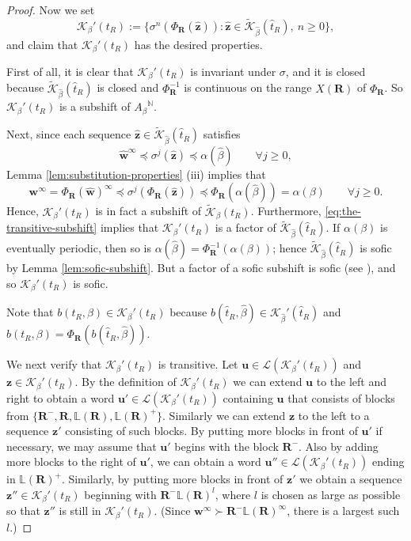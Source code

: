 \documentclass[11pt]{amsart}
\theoremstyle{definition}
\theoremstyle{remark}
\numberwithin{equation}{section}
\newcommand{\N}{\ensuremath{\mathbb{N}}}
\renewcommand{\L}{\ensuremath{\mathbb{L}}}
\newcommand{\Kt}{\widetilde{\mathcal{K}}}
\newcommand{\bR}{\mathbf{R}}
\newcommand{\cL}{\mathcal{L}}
\renewcommand{\u}{\mathbf{u}}
\newcommand{\w}{\mathbf{w}}
\newcommand{\z}{\mathbf{z}}
\newcommand{\f}{\infty}
\newcommand{\al}{\alpha}
\newcommand{\lle}{\preccurlyeq}
\begin{document}
\begin{proof}
Now we set
\begin{equation} \label{eq:the-transitive-subshift}
\mathcal{K}_\beta'(t_R):=\{\sigma^n(\Phi_{\bR}(\hat{\z})): \hat{\z}\in \Kt_{\hat\beta}(\hat{t}_R),\ n\geq 0\},
\end{equation}
and claim that $\mathcal{K}_\beta'(t_R)$ has the desired properties.

First of all, it is clear that $\mathcal{K}_\beta'(t_R)$ is invariant under $\sigma$, and it is closed because {$\Kt_{\hat\beta}(\hat{t}_R)$} is closed and $\Phi_{\bR}^{-1}$ is continuous on the range $X(\bR)$ of $\Phi_{\bR}$. So $\mathcal{K}_\beta'(t_R)$ is a subshift of ${A_\beta}^\N$.

Next, since each sequence $\hat{\z}\in \Kt_{\hat\beta}(\hat{t}_R)$ satisfies
\[
\hat{\w}^\f\lle\sigma^j(\hat{\z})\lle \alpha(\hat{\beta}) \qquad \forall j\geq 0,
\]
Lemma \ref{lem:substitution-properties} (iii) implies that
\[
\w^\f=\Phi_{\bR}(\hat{\w})^\f\lle \sigma^j(\Phi_{\bR}(\hat{\z}))\lle \Phi_{\bR}(\alpha(\hat{\beta}))=\alpha(\beta) \qquad \forall j\geq 0.
\]
Hence, $\mathcal{K}_\beta'(t_R)$ is in fact a subshift of $\Kt_\beta(t_R)$. Furthermore, \eqref{eq:the-transitive-subshift} implies that $\mathcal{K}_\beta'(t_R)$ is a factor of $\Kt_{\hat\beta}(\hat{t}_R)$. If $\al(\beta)$ is eventually periodic, then so is $\al(\hat{\beta})=\Phi_\bR^{-1}(\al(\beta))$; hence $\Kt_{\hat\beta}(\hat{t}_R)$ is sofic by Lemma \ref{lem:sofic-subshift}. But a factor of a sofic subshift is sofic (see \cite[Corollary 3.2.2]{Lind_Marcus_1995}), and so $\mathcal{K}_\beta'(t_R)$ is sofic.

Note that $b(t_R,\beta)\in \mathcal{K}_\beta'(t_R)$ because $b(\hat{t}_R,\hat{\beta})\in \mathcal{K}_{\hat\beta}'(\hat{t}_R)$ and $b(t_R,\beta)=\Phi_{\bR}(b(\hat{t}_R,\hat{\beta}))$.

We next verify that $\mathcal{K}_\beta'(t_R)$ is transitive. Let $\u\in\cL(\mathcal{K}_\beta'(t_R))$ and $\z\in\mathcal{K}_\beta'(t_R)$. By the definition of $\mathcal{K}_\beta'(t_R)$ we can extend $\u$ to the left and right to obtain a word $\u'\in\cL(\mathcal{K}_\beta'(t_R))$ containing $\u$ that consists of blocks from $\{\bR^-,\bR,\L(\bR),\L(\bR)^+\}$. Similarly we can extend $\z$ to the left to a sequence $\z'$ consisting of such blocks. By putting more blocks in front of $\u'$ if necessary, we may assume that $\u'$ begins with the block $\bR^-$. Also by adding more blocks to the right of $\u'$, we can obtain a word $\u''\in\cL(\mathcal{K}_\beta'(t_R))$ ending in $\L(\bR)^+$. Similarly, by putting more blocks in front of $\z'$ we obtain a sequence $\z''\in \mathcal{K}_\beta'(t_R)$ beginning with $\bR^-\L(\bR)^{l}$, where $l$ is chosen as large as possible so that $\z''$ is still in $\mathcal{K}_\beta'(t_R)$. (Since $\w^\f\succ \bR^-\L(\bR)^\f$, there is a largest such $l$.)


\end{proof}
\end{document}
